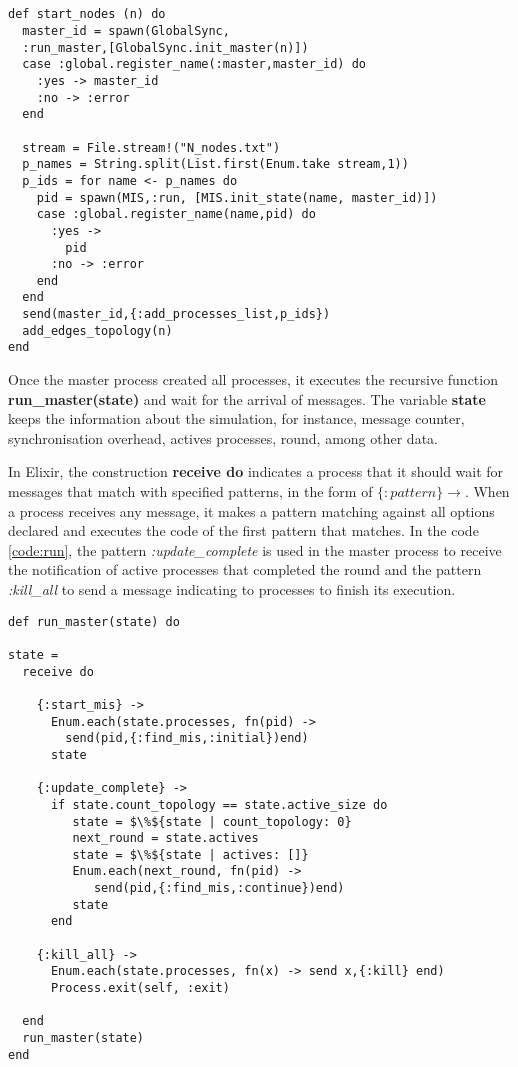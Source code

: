 \begin{lstlisting}[frame=single, columns=fullflexible, mathescape=true, caption= start\_nodes function, label = code:start]


def start_nodes (n) do
  master_id = spawn(GlobalSync,
  :run_master,[GlobalSync.init_master(n)])
  case :global.register_name(:master,master_id) do
    :yes -> master_id
    :no -> :error
  end

  stream = File.stream!("N_nodes.txt")
  p_names = String.split(List.first(Enum.take stream,1))
  p_ids = for name <- p_names do
    pid = spawn(MIS,:run, [MIS.init_state(name, master_id)])
    case :global.register_name(name,pid) do
      :yes ->
        pid
      :no -> :error
    end
  end
  send(master_id,{:add_processes_list,p_ids})
  add_edges_topology(n)
end
\end{lstlisting}


Once the master process created all processes, it executes the recursive function \textbf{run\_master(state)} and wait for the arrival of messages. The variable \textbf{state} keeps the information about the simulation, for instance, message counter, synchronisation overhead, actives processes, round, among other data.

In Elixir, the construction \textbf{receive do} indicates a process that it should wait for messages that match with specified patterns, in the form of $\{:pattern\} \rightarrow$. When a process receives any message, it makes a pattern matching against all options declared and executes the code of the first pattern that matches. In the code \ref{code:run}, the pattern \textit{:update\_complete} is used in the master process to receive the notification of active processes that completed the round and the pattern \textit{:kill\_all} to send a message indicating to processes to finish its execution. 

\begin{lstlisting}[frame=single, columns=fullflexible, mathescape=true, caption= run\_master function for master, label = code:run]
def run_master(state) do

state =
  receive do

    {:start_mis} ->
      Enum.each(state.processes, fn(pid) ->
        send(pid,{:find_mis,:initial})end)
      state

    {:update_complete} ->
      if state.count_topology == state.active_size do
         state = $\%${state | count_topology: 0}
         next_round = state.actives
         state = $\%${state | actives: []}
         Enum.each(next_round, fn(pid) -> 
            send(pid,{:find_mis,:continue})end)
         state
      end
        
    {:kill_all} ->
      Enum.each(state.processes, fn(x) -> send x,{:kill} end)
      Process.exit(self, :exit)
      
  end
  run_master(state)
end

\end{lstlisting}

